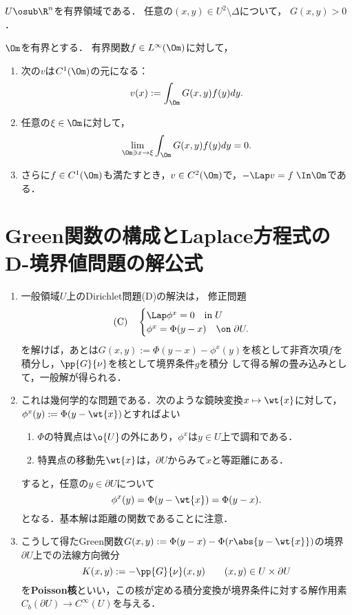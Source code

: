 \documentclass[uplatex,dvipdfmx]{jsreport}
\begin{document}
\begin{proposition}[Green関数は正値である]
    $U\osub\R^n$を有界領域である．
    任意の$(x,y)\in U^2\setminus\Delta$について，
    $G(x,y)>0$．
\end{proposition}

\begin{proposition}[一般の有界領域上のPoisson方程式の解]
    $\Om$を有界とする．
    有界関数$f\in L^\infty(\Om)$に対して，
    \begin{enumerate}
        \item 次の$v$は$C^1(\Om)$の元になる：
        \[v(x):=\int_\Om G(x,y)f(y)dy.\]
        \item 任意の$\xi\in\Om$に対して，
        \[\lim_{\Om\ni x\to\xi}\int_\Om G(x,y)f(y)dy=0.\]
        \item さらに$f\in C^1(\Om)$も満たすとき，$v\in C^2(\Om)$で，$-\Lap v=f\;\In\Om$である．
    \end{enumerate}
\end{proposition}

\section{Green関数の構成とLaplace方程式のD-境界値問題の解公式}

\begin{tcolorbox}[colframe=ForestGreen, colback=ForestGreen!10!white,breakable,colbacktitle=ForestGreen!40!white,coltitle=black,fonttitle=\bfseries\sffamily,
title=]
    \begin{enumerate}
        \item 一般領域$U$上のDirichlet問題(D)の解決は，
        修正問題
        \[\text{(C)}\quad\begin{cases}
            \Lap\phi^x=0\quad\mathrm{in}\; U\\
            \phi^x=\Phi(y-x)\quad\on\;\partial U.
        \end{cases}\]
        を解けば，あとは$G(x,y):=\Phi(y-x)-\phi^x(y)$を核として非斉次項$f$を積分し，$\pp{G}{\nu}$を核として境界条件$g$を積分
        して得る解の畳み込みとして，一般解が得られる．
        \item これは幾何学的な問題である．次のような鏡映変換$x\mapsto\wt{x}$に対して，$\phi^x(y):=\Phi(y-\wt{x})$とすればよい
        \begin{enumerate}
            \item $\Phi$の特異点は$\o{U}$の外にあり，$\phi^x$は$y\in U$上で調和である．
            \item 特異点の移動先$\wt{x}$は，$\partial U$からみて$x$と等距離にある．
        \end{enumerate}
        すると，任意の$y\in\partial U$について
        \[\phi^x(y)=\Phi(y-\wt{x})=\Phi(y-x).\]
        となる．基本解は距離の関数であることに注意．
        \item こうして得たGreen関数$G(x,y):=\Phi(y-x)-\Phi(r\abs{y-\wt{x}})$の境界$\partial U$上での法線方向微分
        \[K(x,y):=-\pp{G}{\nu}(x,y)\qquad(x,y)\in U\times\partial U\]
        を\textbf{Poisson核}といい，この核が定める積分変換が境界条件に対する解作用素$C_b(\partial U)\to C^\infty(U)$を与える．
    \end{enumerate}
\end{tcolorbox}
\end{document}
